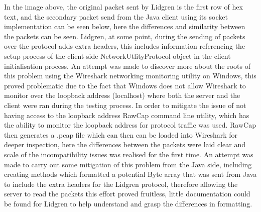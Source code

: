 \documentclass{article}
\begin{document}
In the image above, the original packet sent by Lidgren is the first row of hex text, and the secondary packet send from the Java client using its socket implementation can be seen below, here the differences and similarity between the packets can be seen. Lidgren, at some point, during the sending of packets over the protocol adds extra headers, this includes information referencing the setup process of the client-side NetworkUtlityProtocol object in the client initialisation process. An attempt was made to discover more about the roots of this problem using the Wireshark networking monitoring utility on Windows, this proved problematic due to the fact that Windows does not allow Wireshark to monitor over the loopback address (localhost) where both the server and the client were ran during the testing process. In order to mitigate the issue of not having access to the loopback address RawCap command line utility, which has the ability to monitor the loopback address for protocol traffic was used. RawCap then generates a .pcap file which can then can be loaded into Wireshark for deeper inspection, here the differences between the packets were laid clear and scale of the incompatibility issues was realised for the first time. An attempt was made to carry out some mitigation of this problem from the Java side, including creating methods which formatted a potential Byte array that was sent from Java to include the extra headers for the Lidgren protocol, therefore allowing the server to read the packets this effort proved fruitless, little documentation could be found for Lidgren to help understand and grasp the differences in formatting.
\end{document}
